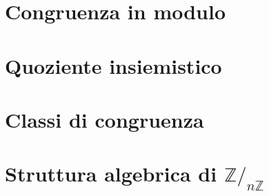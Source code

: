 \documentclass[oneside]{book}
\begin{document}
\section{Congruenza in modulo}
\section{Quoziente insiemistico}
\section{Classi di congruenza}
\section{Struttura algebrica di $\mathbb{Z}/_{n\mathbb{Z}}$}
\end{document}
